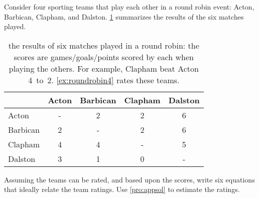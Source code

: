 \begin{exercise} \label{ex:roundrobin4} 
Consider four sporting teams that play each other in a round robin  event: Acton, Barbican, Clapham, and Dalston.
\cref{tbl:roundrobin4} summarizes the results of the six matches played.
\begin{table}
\caption{the results of six matches played in a round robin: the scores are games\slash goals\slash points scored by each when playing the others.  For example, Clapham beat Acton 4~to~2. \cref{ex:roundrobin4} rates these teams.}
\label{tbl:roundrobin4}
\begin{center}
\begin{tabular}{l|cccc} \hline
&Acton& Barbican& Clapham& Dalston\\ \hline
Acton & - & 2 & 2 & 6 \\
Barbican & 2 & - & 2 & 6 \\
Clapham & 4 & 4 & - & 5 \\
Dalston & 3 & 1 & 0 & - \\ \hline
\end{tabular}
\end{center}
\end{table}%
Assuming the teams can be rated, and  based upon the scores, write six equations that ideally relate the team ratings.  
Use \cref{pro:appsol} to estimate the ratings.
\end{exercise}




